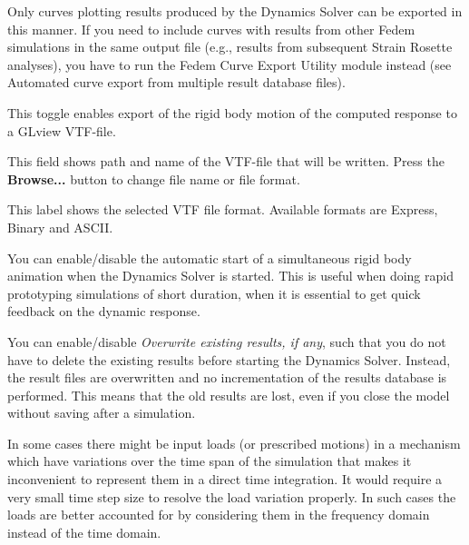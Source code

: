 Only curves plotting results produced by the Dynamics Solver can be exported
in this manner. If you need to include curves with results from other Fedem
simulations in the same output file (e.g., results from subsequent Strain
Rosette analyses), you have to run the Fedem Curve Export Utility module instead
(see 
                {Automated curve export from multiple result database files}).

\begin{bulletlist}
  \setcounter{enumi}{3}
\item
  This toggle enables export of the rigid body motion of the computed
  response to a GLview VTF-file.
\item
  This field shows path and name of the VTF-file that will be written.
  Press the \textbf{Browse...} button to change file name or file
  format.
\item
  This label shows the selected VTF file format. Available formats are
  Express, Binary and ASCII.
\item
  You can enable/disable the automatic start of a simultaneous rigid
  body animation when the Dynamics Solver is started. This is useful
  when doing rapid prototyping simulations of short duration, when it is
  essential to get quick feedback on the dynamic response.
\item
  You can enable/disable {\sl Overwrite existing results, if any},
  such that you do not have to delete the existing results before
  starting the Dynamics Solver. Instead, the result files are overwritten
  and no incrementation of the results database is performed.
  This means that the old results are lost, even if you close the model
  without saving after a simulation.
\end{bulletlist}




In some cases there might be input loads (or prescribed motions) in a
mechanism which have variations over the time span of the simulation
that makes it inconvenient to represent them in a direct time integration.
It would require a very small time step size to resolve the load variation
properly. In such cases the loads are better accounted for by considering them
in the frequency domain instead of the time domain.

